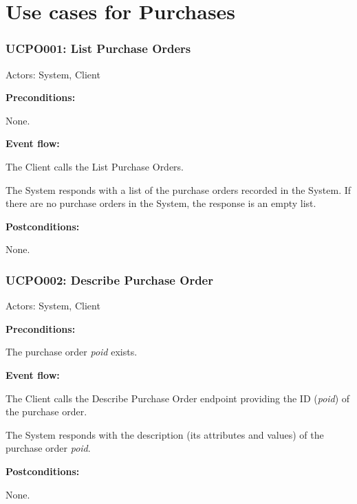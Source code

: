\section{Use cases for Purchases}

\begin{ucbox}{\subsubsection{UCPO001: List Purchase Orders}}
\label{UCPO001}

Actors: System, Client

\textbf{Preconditions:}

\ucitem None.

\textbf{Event flow:}

\ucitem The Client calls the List Purchase Orders.

\ucitem The System responds with a list of the purchase orders recorded in the System. If there are no purchase orders in the System, the response is an empty list.

\textbf{Postconditions:}

\ucitem None.

\end{ucbox}

\begin{ucbox}{\subsubsection{UCPO002: Describe Purchase Order}}
\label{UCPO002}

Actors: System, Client

\textbf{Preconditions:} 

\ucitem The purchase order \textit{poid} exists.

\textbf{Event flow:}

\ucitem The Client calls the Describe Purchase Order endpoint providing the ID (\textit{poid}) of the purchase order.

\ucitem The System responds with the description (its attributes and values) of the purchase order \textit{poid}.

\textbf{Postconditions:}

\ucitem None.

\end{ucbox}

